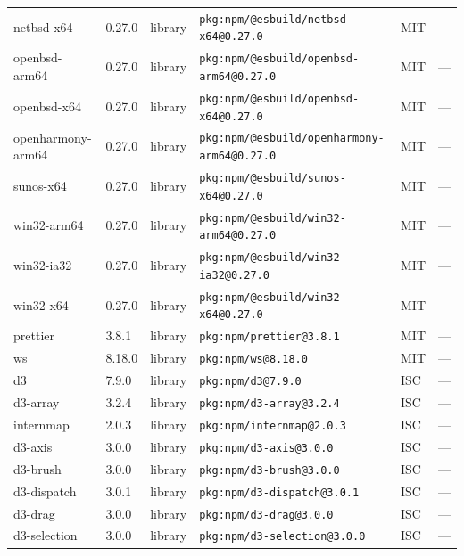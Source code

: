 \documentclass[11pt,a4paper]{article}
\begin{document}
\begin{longtable}{|p{4cm}|p{2cm}|p{1.6cm}|p{5cm}|p{1.5cm}|p{3.5cm}|}
\raggedright netbsd-x64 & 0.27.0 & library & \small\texttt{pkg:npm/@esbuild/netbsd-x64@0.27.0} & MIT & \small — \\
\raggedright openbsd-arm64 & 0.27.0 & library & \small\texttt{pkg:npm/@esbuild/openbsd-arm64@0.27.0} & MIT & \small — \\
\raggedright openbsd-x64 & 0.27.0 & library & \small\texttt{pkg:npm/@esbuild/openbsd-x64@0.27.0} & MIT & \small — \\
\raggedright openharmony-arm64 & 0.27.0 & library & \small\texttt{pkg:npm/@esbuild/openharmony-arm64@0.27.0} & MIT & \small — \\
\raggedright sunos-x64 & 0.27.0 & library & \small\texttt{pkg:npm/@esbuild/sunos-x64@0.27.0} & MIT & \small — \\
\raggedright win32-arm64 & 0.27.0 & library & \small\texttt{pkg:npm/@esbuild/win32-arm64@0.27.0} & MIT & \small — \\
\raggedright win32-ia32 & 0.27.0 & library & \small\texttt{pkg:npm/@esbuild/win32-ia32@0.27.0} & MIT & \small — \\
\raggedright win32-x64 & 0.27.0 & library & \small\texttt{pkg:npm/@esbuild/win32-x64@0.27.0} & MIT & \small — \\
\raggedright prettier & 3.8.1 & library & \small\texttt{pkg:npm/prettier@3.8.1} & MIT & \small — \\
\raggedright ws & 8.18.0 & library & \small\texttt{pkg:npm/ws@8.18.0} & MIT & \small — \\
\raggedright d3 & 7.9.0 & library & \small\texttt{pkg:npm/d3@7.9.0} & ISC & \small — \\
\raggedright d3-array & 3.2.4 & library & \small\texttt{pkg:npm/d3-array@3.2.4} & ISC & \small — \\
\raggedright internmap & 2.0.3 & library & \small\texttt{pkg:npm/internmap@2.0.3} & ISC & \small — \\
\raggedright d3-axis & 3.0.0 & library & \small\texttt{pkg:npm/d3-axis@3.0.0} & ISC & \small — \\
\raggedright d3-brush & 3.0.0 & library & \small\texttt{pkg:npm/d3-brush@3.0.0} & ISC & \small — \\
\raggedright d3-dispatch & 3.0.1 & library & \small\texttt{pkg:npm/d3-dispatch@3.0.1} & ISC & \small — \\
\raggedright d3-drag & 3.0.0 & library & \small\texttt{pkg:npm/d3-drag@3.0.0} & ISC & \small — \\
\raggedright d3-selection & 3.0.0 & library & \small\texttt{pkg:npm/d3-selection@3.0.0} & ISC & \small — \\

\end{longtable}
\end{document}
